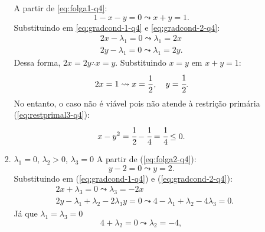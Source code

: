 \documentclass[11pt,a4paper]{article}
\begin{document}
\begin{enumerate}
\begin{itemize}
\begin{enumerate}[label=\roman*]
                A partir de \ref{eq:folga1-q4}:
                \begin{equation*}
                    1 - x - y = 0 \leadsto x + y = 1.
                \end{equation*}
                Substituindo em \ref{eq:gradcond-1-q4} e \ref{eq:gradcond-2-q4}:
                \begin{equation*}
                    \begin{aligned}
                        2x - \lambda_1 = 0 \leadsto \lambda_1 = 2x\\
                        2y - \lambda_1 = 0 \leadsto \lambda_1 = 2y.
                    \end{aligned}
                \end{equation*}
                Dessa forma, $2x =2y \therefore x = y$. Substituindo $x = y$ em $x + y = 1$:
                \begin{equation*}
                    2x = 1 \leadsto x = \frac{1}{2}, \quad y = \cfrac{1}{2}.
                \end{equation*}
                No entanto, o caso não é viável pois não atende à restrição primária (\ref{eq:restprimal3-q4}):
                \begin{equation*}
                    x - y^2 = \cfrac{1}{2} - \cfrac{1}{4} = \cfrac{1}{4} \leq 0.
                \end{equation*}
                \item $\lambda_1 = 0$, $\lambda_2 > 0$, $\lambda_3 = 0$
                A partir de (\ref{eq:folga2-q4}):
                \begin{equation*}
                    y - 2 = 0 \leadsto y = 2.
                \end{equation*}
                Substituindo em (\ref{eq:gradcond-1-q4}) e (\ref{eq:gradcond-2-q4}):
                \begin{equation*}
                    \begin{aligned}
                        & 2x + \lambda_3 = 0 \leadsto \lambda_3 = -2x\\
                        & 2 y - \lambda_1 + \lambda_2 - 2\lambda_3y = 0 \leadsto 4 - \lambda_1 + \lambda_2 - 4\lambda_3 = 0.
                    \end{aligned}
                \end{equation*}
                Já que $\lambda_1 = \lambda_3 = 0$
                \begin{equation*}
                    4 + \lambda_2 = 0 \leadsto \lambda_2 = -4,

\end{equation*}
\end{enumerate}
\end{itemize}
\end{enumerate}
\end{document}
